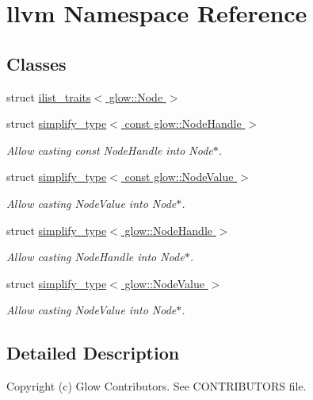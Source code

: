 \hypertarget{namespacellvm}{}\section{llvm Namespace Reference}
\label{namespacellvm}
\subsection*{Classes}
\begin{DoxyCompactItemize}
\item 
struct \hyperlink{structllvm_1_1ilist__traits_3_01glow_1_1_node_01_4}{ilist\+\_\+traits$<$ glow\+::\+Node $>$}
\item 
struct \hyperlink{structllvm_1_1simplify__type_3_01const_01glow_1_1_node_handle_01_4}{simplify\+\_\+type$<$ const glow\+::\+Node\+Handle $>$}
\begin{DoxyCompactList}\small\item\em Allow casting const Node\+Handle into Node$\ast$. \end{DoxyCompactList}\item 
struct \hyperlink{structllvm_1_1simplify__type_3_01const_01glow_1_1_node_value_01_4}{simplify\+\_\+type$<$ const glow\+::\+Node\+Value $>$}
\begin{DoxyCompactList}\small\item\em Allow casting Node\+Value into Node$\ast$. \end{DoxyCompactList}\item 
struct \hyperlink{structllvm_1_1simplify__type_3_01glow_1_1_node_handle_01_4}{simplify\+\_\+type$<$ glow\+::\+Node\+Handle $>$}
\begin{DoxyCompactList}\small\item\em Allow casting Node\+Handle into Node$\ast$. \end{DoxyCompactList}\item 
struct \hyperlink{structllvm_1_1simplify__type_3_01glow_1_1_node_value_01_4}{simplify\+\_\+type$<$ glow\+::\+Node\+Value $>$}
\begin{DoxyCompactList}\small\item\em Allow casting Node\+Value into Node$\ast$. \end{DoxyCompactList}\end{DoxyCompactItemize}


\subsection{Detailed Description}
Copyright (c) Glow Contributors. See C\+O\+N\+T\+R\+I\+B\+U\+T\+O\+RS file.

